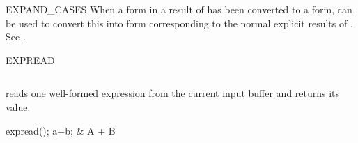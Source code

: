 \begin{Operator}{EXPAND\_CASES}
When a  form in a result of  
has been converted to a  form, 
can be used to convert this into form corresponding to the
normal explicit results of . See .
\end{Operator}

\begin{Operator}[expread]{EXPREAD}
\begin{Syntax}
\(\)
\end{Syntax}

 reads one well-formed expression from the current input
buffer and returns its value.

\begin{Examples}
expread(); a+b;  & A + B
\end{Examples}

\end{Operator}


